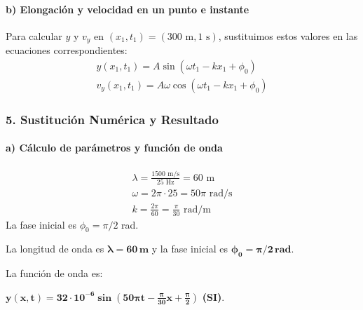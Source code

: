 \paragraph*{b) Elongación y velocidad en un punto e instante}
Para calcular $y$ y $v_y$ en $(x_1, t_1) = (300 \text{ m}, 1 \text{ s})$, sustituimos estos valores en las ecuaciones correspondientes:
\begin{gather}
    y(x_1, t_1) = A \sin(\omega t_1 - kx_1 + \phi_0) \\
    v_y(x_1, t_1) = A\omega \cos(\omega t_1 - kx_1 + \phi_0)
\end{gather}

\subsubsection*{5. Sustitución Numérica y Resultado}
\paragraph*{a) Cálculo de parámetros y función de onda}
\begin{gather}
    \lambda = \frac{1500 \text{ m/s}}{25 \text{ Hz}} = 60 \text{ m} \\
    \omega = 2\pi \cdot 25 = 50\pi \text{ rad/s} \\
    k = \frac{2\pi}{60} = \frac{\pi}{30} \text{ rad/m}
\end{gather}
La fase inicial es $\phi_0 = \pi/2$ rad.
\begin{cajaresultado}
    La longitud de onda es $\boldsymbol{\lambda=60 \, \textbf{m}}$ y la fase inicial es $\boldsymbol{\phi_0 = \pi/2 \, \textbf{rad}}$.
\end{cajaresultado}
La función de onda es:
\begin{cajaresultado}
    $\boldsymbol{y(x,t) = 32 \cdot 10^{-6} \sin\left(50\pi t - \frac{\pi}{30}x + \frac{\pi}{2}\right)}$ \textbf{(SI)}.
\end{cajaresultado}

